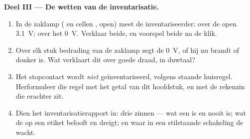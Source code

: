 \begin{problem}
\medskip\noindent\textbf{Deel III --- De wetten van de inventarisatie.}
\begin{enumerate}[resume]
  \item In de zaklamp ( en cellen ,
         open) meet de inventariseerder: over
        de open  \qty{3.1}{V}; over het
         \qty{0}{V}. Verklaar beide, en voorspel beide na
        de klik.
  \item Over elk stuk bedrading van de zaklamp zegt de 
        \qty{0}{V}, of hij nu brandt of donker is. Wat verklaart dit
        over goede draad, in duwtaal?
  \item Het stopcontact wordt \emph{niet} geïnventariseerd, volgens
        staande huisregel. Herformuleer die regel met het getal van
        dit hoofdstuk, en met de rekenzin die erachter zit.
  \item Dien het inventarisatierapport in: drie zinnen --- wat een
         is en nooit is; wat de
         op een etiket belooft en dreigt; en
        waar in een stilstaande schakeling de  wacht.
\end{enumerate}
\end{problem}
